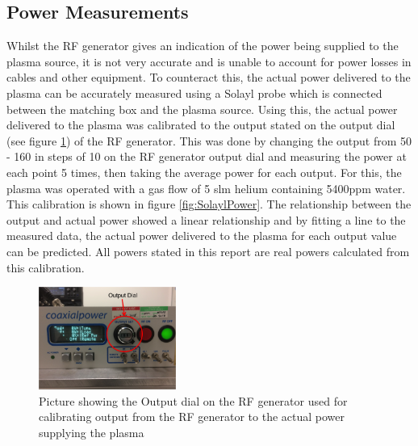 \documentclass[11pt, oneside]{article}   	%
\begin{document}
\subsection{Power Measurements}

Whilst the RF generator gives an indication of the power being supplied to the plasma source, it is not very accurate and is unable to account for power losses in cables and other equipment.
To counteract this, the actual power delivered to the plasma can be accurately measured using a Solayl probe which is connected between the matching box and the plasma source.
Using this, the actual power delivered to the plasma was calibrated to the output stated on the output dial (see figure \ref{fig:OutputDial}) of the RF generator. 
This was done by changing the output from 50 - 160 in steps of 10 on the RF generator output dial and measuring the power at each point 5 times, then taking the average power for each output.
For this, the plasma was operated with a gas flow of 5 slm helium containing 5400ppm water.
This calibration is shown in figure \ref{fig:SolaylPower}.
The relationship between the output and actual power showed a linear relationship and by fitting a line to the measured data, the actual power delivered to the plasma for each output value can be predicted. 
All powers stated in this report are real powers calculated from this calibration.

\begin{figure}
    \centering
    \includegraphics[width=0.4\textwidth]{Figures/OutputDial.png}
    \caption{Picture showing the Output dial on the RF generator used for calibrating output from the RF generator to the actual power supplying the plasma}
    \label{fig:OutputDial}
\end{figure}
\end{document}
